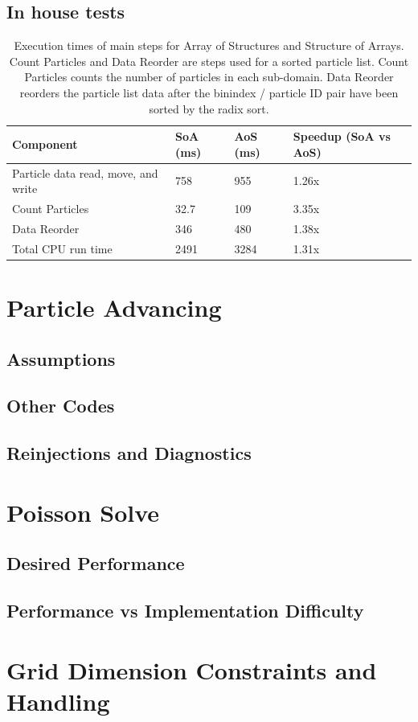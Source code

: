 		\subsection{In house tests}
\noindent \begin{table}[h]
\begin{tabular}{| p{4.0cm} | p{3.5cm} | p{2.5cm} | p{4.0cm} |}
\hline
Component & SoA (ms) & AoS (ms) & Speedup (SoA vs AoS) \\ \hline
Particle data read, move, and write & 758 & 955 & 1.26x \\ \hline
Count Particles & 32.7 & 109 & 3.35x \\ \hline
Data Reorder & 346 & 480 & 1.38x \\ \hline
Total CPU run time & 2491 & 3284 & 1.31x \\ \hline
\end{tabular}
\caption{Execution times of main steps for Array of Structures and Structure of Arrays. Count Particles and Data Reorder are steps used for a sorted particle list. Count Particles counts the number of particles in each sub-domain. Data Reorder reorders the particle list data after the binindex / particle ID pair have been sorted by the radix sort.}
\label{tab:struct_compare} 
\end{table}

	\section{Particle Advancing}
		\subsection{Assumptions}
		\subsection{Other Codes}
		\subsection{Reinjections and Diagnostics}

	\section{Poisson Solve}
		\subsection{Desired Performance}
		\subsection{Performance vs Implementation Difficulty}

	\section{Grid Dimension Constraints and Handling}
